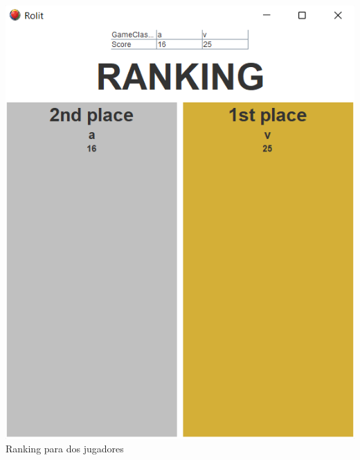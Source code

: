 \documentclass[../DocumentoOficial.tex]{subfiles}
\begin{document}
\begin{center}
\includegraphics[scale=0.6]{ranking-2players.png}\\
\footnotesize{Ranking para dos jugadores}
\end{center}
\end{document}
